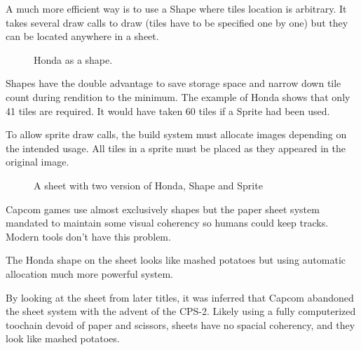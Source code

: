 A much more efficient way is to use a Shape where tiles location is arbitrary. It takes several draw calls to draw (tiles have to be specified one by one) but they can be located anywhere in a sheet.

 \begin{figure}[H]
\caption*{Honda as a shape.}
\end{figure}

Shapes have the double advantage to save storage space and narrow down tile count during rendition to the minimum. The example of Honda shows that only 41 tiles are required. It would have taken 60 tiles if a Sprite had been used.

To allow sprite draw calls, the build system must allocate images depending on the intended usage. All tiles in a sprite must be placed as they appeared in the original image.
 
\begin{figure}[H]
\caption*{A sheet with two version of Honda, Shape and Sprite}
\end{figure}


Capcom games use almost exclusively shapes but the paper sheet system mandated to maintain some visual coherency so humans could keep tracks. Modern tools don't have this problem. 

The Honda shape on the sheet looks like mashed potatoes but using automatic allocation much more powerful system.

By looking at the sheet from later titles, it was inferred that Capcom abandoned the sheet system with the advent of the CPS-2. Likely using a fully computerized toochain devoid of paper and scissors, sheets have no spacial coherency, and they look like mashed potatoes.


